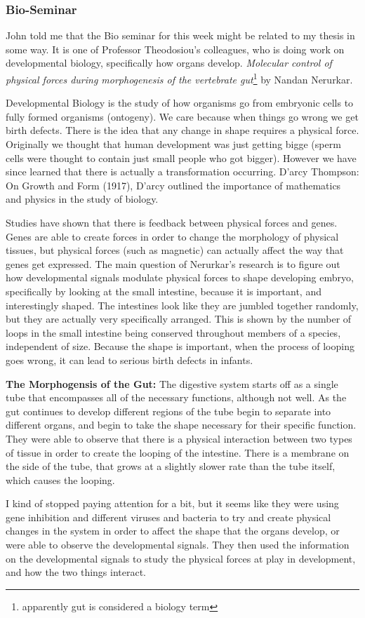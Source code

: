 \documentclass[letterpaper,oneside,titlepage]{article}
\begin{document}
\subsubsection{Bio-Seminar}
John told me that the Bio seminar for this week might be related to my thesis in some way.  It is one of Professor Theodosiou's colleagues, who is doing work on developmental biology, specifically how organs develop.  \emph{Molecular control of physical forces during morphogenesis of the vertebrate gut}\footnote{apparently gut is considered a biology term} by Nandan Nerurkar.
\par
Developmental Biology is the study of how organisms go from embryonic cells to fully formed organisms (ontogeny).  We care because when things go wrong we get birth defects.  There is the idea that any change in shape requires a physical force.  Originally we thought that human development was just getting bigge (sperm cells were thought to contain just small people who got bigger).  However we have since learned that there is actually a transformation occurring.  D'arcy Thompson: On Growth and Form (1917), D'arcy outlined the importance of mathematics and physics in the study of biology.
\par
Studies have shown that there is feedback between physical forces and genes.  Genes are able to create forces in order to change the morphology of physical tissues, but physical forces (such as magnetic) can actually affect the way that genes get expressed.  The main question of Nerurkar's research is to figure out how developmental signals modulate physical forces to shape developing embryo, specifically by looking at the small intestine, because it is important, and interestingly shaped.  The intestines look like they are jumbled together randomly, but they are actually very specifically arranged.  This is shown by the number of loops in the small intestine being conserved throughout members of a species, independent of size.  Because the shape is important, when the process of looping goes wrong, it can lead to serious birth defects in infants.
\par
\textbf{The Morphogensis of the Gut:}  The digestive system starts off as a single tube that encompasses all of the necessary functions, although not well.  As the gut continues to develop different regions of the tube begin to separate into different organs, and begin to take the shape necessary for their specific function.  They were able to observe that there is a physical interaction between two types of tissue in order to create the looping of the intestine.  There is a membrane on the side of the tube, that grows at a slightly slower rate than the tube itself, which causes the looping.
\par
I kind of stopped paying attention for a bit, but it seems like they were using gene inhibition and different viruses and bacteria to try and create physical changes in the system in order to affect the shape that the organs develop, or were able to observe the developmental signals.  They then used the information on the developmental signals to study the physical forces at play in development, and how the two things interact.
\end{document}
